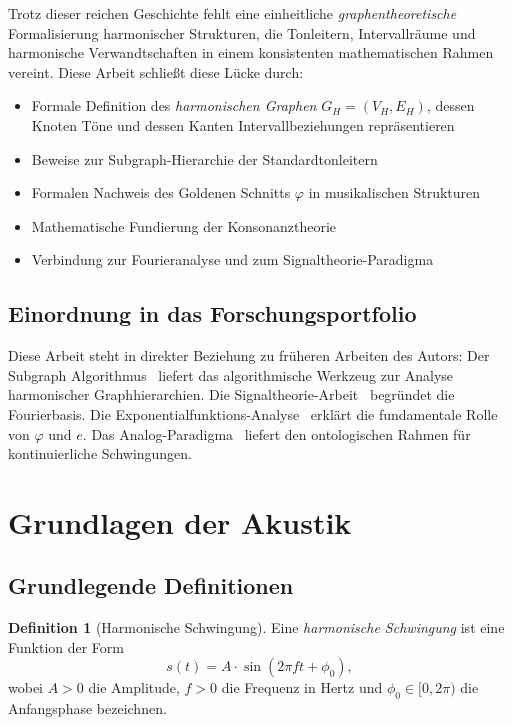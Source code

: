 ﻿\documentclass[a4paper,12pt]{article}
\theoremstyle{definition}
\newtheorem{definition}{Definition}
\begin{document}
Trotz dieser reichen Geschichte fehlt eine einheitliche \emph{graphentheoretische}
Formalisierung harmonischer Strukturen, die Tonleitern, Intervallräume und
harmonische Verwandtschaften in einem konsistenten mathematischen Rahmen vereint.
Diese Arbeit schließt diese Lücke durch:

\begin{itemize}
    \item Formale Definition des \emph{harmonischen Graphen} $G_H = (V_H, E_H)$,
          dessen Knoten Töne und dessen Kanten Intervallbeziehungen repräsentieren
    \item Beweise zur Subgraph-Hierarchie der Standardtonleitern
    \item Formalen Nachweis des Goldenen Schnitts $\varphi$ in musikalischen Strukturen
    \item Mathematische Fundierung der Konsonanztheorie
    \item Verbindung zur Fourieranalyse und zum Signaltheorie-Paradigma
\end{itemize}

\subsection{Einordnung in das Forschungsportfolio}

Diese Arbeit steht in direkter Beziehung zu früheren Arbeiten des Autors:
Der Subgraph Algorithmus~\cite{epp2026subgraph} liefert das algorithmische Werkzeug
zur Analyse harmonischer Graphhierarchien. Die Signaltheorie-Arbeit~\cite{epp2026signal}
begründet die Fourierbasis. Die Exponentialfunktions-Analyse~\cite{epp2026expl} erklärt
die fundamentale Rolle von $\varphi$ und $e$. Das Analog-Paradigma~\cite{epp2026analog}
liefert den ontologischen Rahmen für kontinuierliche Schwingungen.

\section{Grundlagen der Akustik}

\subsection{Grundlegende Definitionen}

\begin{definition}[Harmonische Schwingung]
Eine \emph{harmonische Schwingung} ist eine Funktion der Form
\[
s(t) = A \cdot \sin(2\pi f t + \phi_0),
\]
wobei $A > 0$ die Amplitude, $f > 0$ die Frequenz in Hertz und $\phi_0 \in [0, 2\pi)$
die Anfangsphase bezeichnen.
\end{definition}
\end{document}
